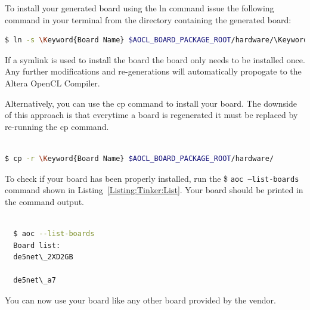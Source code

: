\documentclass{refrep}
\newcommand{\TermCmd}[1]{\$ \texttt{#1}}
\newcommand{\Keyword}[1]{\textbf{\color{BlueViolet}{#1}}}
\begin{document}
To install your generated board using the ln command issue the following command
in your terminal from the directory containing the generated board:

\begin{lstlisting}[language=bash,basicstyle=\footnotesize\ttfamily,commentstyle=\color{red},
    label=Listing:Tinker:Install,captionpos=b,
    caption=Installing a board using the ln command in a correctly installed Altera OpenCL Environment,frame=single]
$ ln -s \Keyword{Board Name} $AOCL_BOARD_PACKAGE_ROOT/hardware/\Keyword{Board Name}
\end{lstlisting}

If a symlink is used to install the board the board only needs to be installed
once. Any further modifications and re-generations will automatically propogate
to the Altera OpenCL Compiler.

Alternatively, you can use the cp command to install your board. The downside of
this approach is that everytime a board is regenerated it must be replaced by
re-running the cp command.

\begin{lstlisting}[language=bash,basicstyle=\footnotesize\ttfamily,commentstyle=\color{red},
    label=Listing:Tinker:List,captionpos=b,
    caption=Installing a board using the cp command,frame=single]
  
$ cp -r \Keyword{Board Name} $AOCL_BOARD_PACKAGE_ROOT/hardware/
\end{lstlisting}




To check if your board has been properly installed, run the \TermCmd{aoc
  --list-boards} command shown in Listing~\ref{Listing:Tinker:List}. Your board
should be printed in the command output.

\begin{lstlisting}[language=bash,basicstyle=\footnotesize\ttfamily,commentstyle=\color{red},
    label=Listing:Tinker:List,captionpos=b,
    caption=Output from running aoc --list-boards after correctly installing the de5net\_2XD2GB board from Section~\ref{Chapter:Generating:Sec:Generation},frame=single]
  
  $ aoc --list-boards
  Board list:
  de5net\_2XD2GB

  de5net\_a7
\end{lstlisting}

You can now use your board like any other board provided by the vendor.


\end{document}
